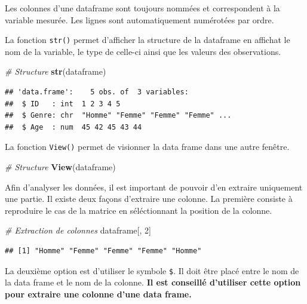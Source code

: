 \documentclass[
]{book}
\newenvironment{Shaded}{\begin{snugshade}}{\end{snugshade}}
\newcommand{\CommentTok}[1]{\textcolor[rgb]{0.56,0.35,0.01}{\textit{#1}}}
\newcommand{\DecValTok}[1]{\textcolor[rgb]{0.00,0.00,0.81}{#1}}
\newcommand{\FunctionTok}[1]{\textcolor[rgb]{0.13,0.29,0.53}{\textbf{#1}}}
\newcommand{\NormalTok}[1]{#1}
\begin{document}
Les colonnes d'une dataframe sont toujours nommées et correspondent à la variable mesurée. Les lignes sont automatiquement numérotées par ordre.

La fonction \texttt{str()} permet d'afficher la structure de la dataframe en affichat le nom de la variable, le type de celle-ci ainsi que les valeurs des observations.

\begin{Shaded}
\begin{Highlighting}[]
\CommentTok{\# Structure}
\FunctionTok{str}\NormalTok{(dataframe)}
\end{Highlighting}
\end{Shaded}

\begin{verbatim}
## 'data.frame':    5 obs. of  3 variables:
##  $ ID   : int  1 2 3 4 5
##  $ Genre: chr  "Homme" "Femme" "Femme" "Femme" ...
##  $ Age  : num  45 42 45 43 44
\end{verbatim}

La fonction \texttt{View()} permet de visionner la data frame dans une autre fenêtre.

\begin{Shaded}
\begin{Highlighting}[]
\CommentTok{\# Structure}
\FunctionTok{View}\NormalTok{(dataframe)}
\end{Highlighting}
\end{Shaded}

Afin d'analyser les données, il est important de pouvoir d'en extraire uniquement une partie. Il existe deux façons d'extraire une colonne. La première consiste à reproduire le cas de la matrice en séléctionnant la position de la colonne.

\begin{Shaded}
\begin{Highlighting}[]
\CommentTok{\# Extraction de colonnes}
\NormalTok{dataframe[, }\DecValTok{2}\NormalTok{]}
\end{Highlighting}
\end{Shaded}

\begin{verbatim}
## [1] "Homme" "Femme" "Femme" "Femme" "Homme"
\end{verbatim}

La deuxième option est d'utiliser le symbole \texttt{\$}. Il doit être placé entre le nom de la data frame et le nom de la colonne.
\textbf{Il est conseillé d'utiliser cette option pour extraire une colonne d'une data frame.}
\end{document}
